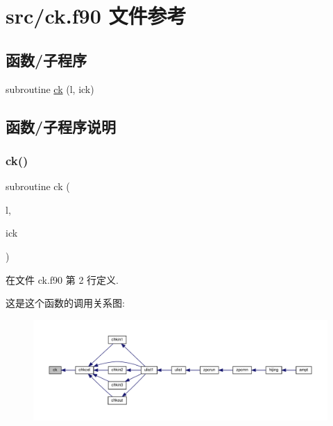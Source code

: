 \hypertarget{ck_8f90}{}\section{src/ck.f90 文件参考}
\label{ck_8f90}
\subsection*{函数/子程序}
\begin{DoxyCompactItemize}
\item 
subroutine \mbox{\hyperlink{ck_8f90_abebb6a61846b8876f5b5244f5e69ff24}{ck}} (l, ick)
\end{DoxyCompactItemize}


\subsection{函数/子程序说明}
\mbox{\label{ck_8f90_abebb6a61846b8876f5b5244f5e69ff24}} 
\subsubsection{\texorpdfstring{ck()}{ck()}}
{\footnotesize\ttfamily subroutine ck (\begin{DoxyParamCaption}\item[{}]{l,  }\item[{}]{ick }\end{DoxyParamCaption})}



在文件 ck.\+f90 第 2 行定义.

这是这个函数的调用关系图\+:
\nopagebreak
\begin{figure}[H]
\begin{center}
\leavevmode
\includegraphics[width=350pt]{ck_8f90_abebb6a61846b8876f5b5244f5e69ff24_icgraph}
\end{center}
\end{figure}
